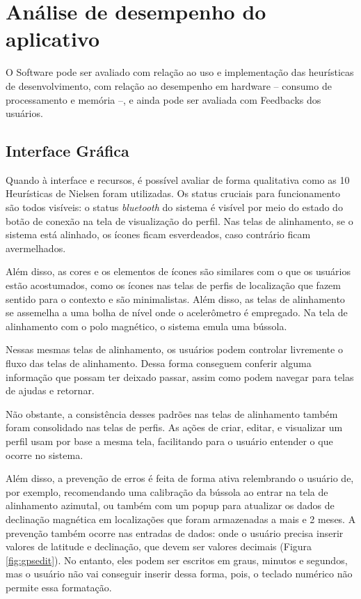 \section{Análise de desempenho do aplicativo}
O Software pode ser avaliado com relação ao uso e implementação das heurísticas de desenvolvimento, com relação ao desempenho em hardware -- consumo de processamento e memória --, e ainda pode ser avaliada com Feedbacks dos usuários. 

\subsection{Interface Gráfica}
Quando à interface e recursos, é possível avaliar de forma qualitativa como as 10 Heurísticas de Nielsen foram utilizadas. Os status cruciais para funcionamento são todos visíveis: o status \textit{bluetooth} do sistema é visível por meio do estado do botão de conexão na tela de visualização do perfil. Nas telas de alinhamento, se o sistema está alinhado, os ícones ficam esverdeados, caso contrário ficam avermelhados.

Além disso, as cores e os elementos de ícones são similares com o que os usuários estão acostumados, como os ícones nas telas de perfis de localização que fazem sentido para o contexto e são minimalistas. Além disso, as telas de alinhamento se assemelha a uma bolha de nível onde o acelerômetro é empregado. Na tela de alinhamento com o polo magnético, o sistema emula uma bússola. 

Nessas mesmas telas de alinhamento, os usuários podem controlar livremente o fluxo das telas de alinhamento. Dessa forma conseguem conferir alguma informação que possam ter deixado passar, assim como podem navegar para telas de ajudas e retornar.

Não obstante, a consistência desses padrões nas telas de alinhamento também foram consolidado nas telas de perfis. As ações de criar, editar, e visualizar um perfil usam por base a mesma tela, facilitando para o usuário entender o que ocorre no sistema. 

Além disso, a prevenção de erros é feita de forma ativa relembrando o usuário de, por exemplo, recomendando uma calibração da bússola ao entrar na tela de alinhamento azimutal, ou também com um popup para atualizar os dados de declinação magnética em localizações que foram armazenadas a mais e 2 meses. A prevenção também ocorre nas entradas de dados:  onde o usuário precisa inserir valores de latitude e declinação, que devem ser valores decimais (Figura \ref{fig:gpsedit}). No entanto, eles podem ser escritos em graus, minutos e segundos, mas o usuário não vai conseguir inserir dessa forma, pois, o teclado numérico não permite essa formatação.

